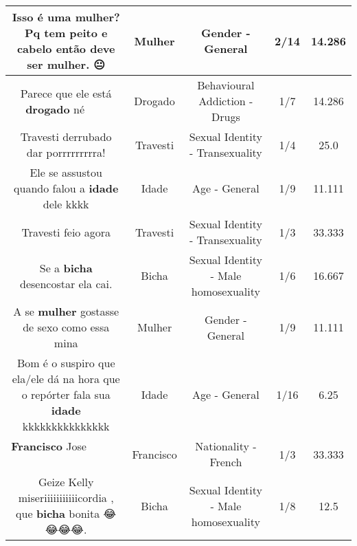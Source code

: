 \documentclass[11pt]{article}
\newlength\mylength
\begin{document}
\begin{center}
\begin{longtable}{|C{.65\mylength}|C{.30\mylength}|C{.12\mylength}|C{.12\mylength}|C{.12\mylength}|}
  \small Isso é uma \textbf{mulher}? Pq tem peito e cabelo então deve ser \textbf{mulher}. 😐\normalsize   & Mulher & Gender - General & 2/14 & 14.286 \\  \hline
  \small Parece que ele está \textbf{drogado} né 👀😂😂😂😂😂\normalsize   & Drogado & Behavioural Addiction - Drugs & 1/7 & 14.286 \\  \hline
  \small Travesti derrubado dar porrrrrrrrra!\normalsize   & Travesti & Sexual Identity - Transexuality & 1/4 & 25.0 \\  \hline
  \small Ele se assustou quando falou a \textbf{idade} dele kkkk\normalsize   & Idade & Age - General & 1/9 & 11.111 \\  \hline
  \small Travesti feio agora\normalsize   & Travesti & Sexual Identity - Transexuality & 1/3 & 33.333 \\  \hline
  \small Se a \textbf{bicha} desencostar ela cai.\normalsize   & Bicha & Sexual Identity - Male homosexuality & 1/6 & 16.667 \\  \hline
  \small A se \textbf{mulher} gostasse de sexo como essa mina\normalsize   & Mulher & Gender - General & 1/9 & 11.111 \\  \hline
  \small Bom é o suspiro que ela/ele dá na hora que o repórter fala sua \textbf{idade} kkkkkkkkkkkkkkk\normalsize   & Idade & Age - General & 1/16 & 6.25 \\  \hline
  \small \@\textbf{Francisco} Jose 🤣🤣😂😂🤣🤣😂😂🤣🤣😂😂🤣\normalsize   & Francisco & Nationality - French & 1/3 & 33.333 \\  \hline
  \small Geize Kelly    miseriiiiiiiiiiicordia , que \textbf{bicha} bonita 😂😂😂😂.\normalsize   & Bicha & Sexual Identity - Male homosexuality & 1/8 & 12.5 \\  \hline

\end{longtable}
\end{center}
\end{document}
